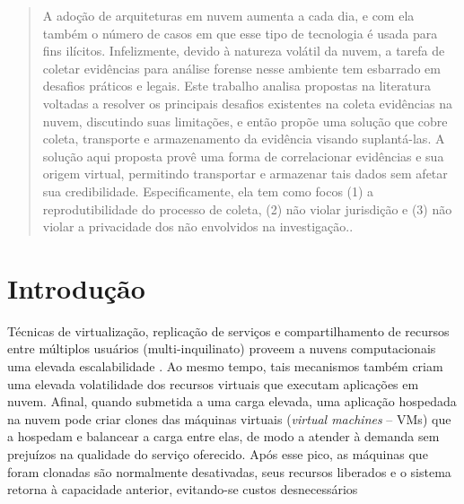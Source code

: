 \documentclass[conference]{IEEEtran}
\begin{document}
\maketitle

\begin{abstract}
A adoção de arquiteturas em nuvem aumenta a cada dia, e com ela também o número de casos em que esse tipo de tecnologia é usada para fins ilícitos. 
%
Infelizmente, devido à natureza volátil da nuvem, a tarefa de coletar evidências para análise forense nesse ambiente tem esbarrado em desafios práticos e legais.
%
Este trabalho analisa propostas na literatura voltadas a resolver os principais desafios existentes na coleta evidências na nuvem, discutindo suas limitações, e então propõe uma solução que cobre coleta, transporte e armazenamento da evidência visando suplantá-las. 
%
A solução aqui proposta provê uma forma de correlacionar evidências e sua origem virtual, permitindo transportar e armazenar tais dados sem afetar sua credibilidade.
%
Especificamente, ela tem como focos (1) a reprodutibilidade do processo de coleta, (2) não violar jurisdição e (3) não violar a privacidade dos não envolvidos na investigação..

\end{abstract}





%
\IEEEpeerreviewmaketitle

\section{Introdução}

%
Técnicas de virtualização, replicação de serviços e compartilhamento de recursos entre múltiplos usuários (multi-inquilinato) proveem a nuvens computacionais uma elevada escalabilidade \cite{Morsy_Cloud_Security:2010}.
%
Ao mesmo tempo, tais mecanismos também criam uma elevada volatilidade dos recursos virtuais que executam aplicações em nuvem.
%
Afinal, quando submetida a uma carga elevada, uma aplicação hospedada na nuvem pode criar clones das máquinas virtuais (\textit{virtual machines} -- VMs) que a hospedam e balancear a carga entre elas, de modo a atender à demanda sem prejuízos na qualidade do serviço oferecido. 
%
Após esse pico, as máquinas que foram clonadas são normalmente desativadas, seus recursos liberados e o sistema retorna à capacidade anterior, evitando-se custos desnecessários
\end{document}
